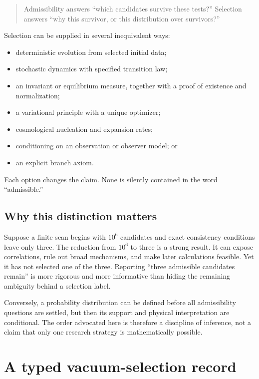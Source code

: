 \documentclass[11pt]{article}
\theoremstyle{definition}
\theoremstyle{remark}
\newcommand{\1}{\mathbf 1}
\begin{document}
\begin{quote}
Admissibility answers ``which candidates survive these tests?''  Selection
answers ``why this survivor, or this distribution over survivors?''
\end{quote}

Selection can be supplied in several inequivalent ways:
\begin{itemize}[leftmargin=2em]
\item deterministic evolution from selected initial data;
\item stochastic dynamics with specified transition law;
\item an invariant or equilibrium measure, together with a proof of
      existence and normalization;
\item a variational principle with a unique optimizer;
\item cosmological nucleation and expansion rates;
\item conditioning on an observation or observer model; or
\item an explicit branch axiom.
\end{itemize}
Each option changes the claim.  None is silently contained in the word
``admissible.''

\subsection{Why this distinction matters}

Suppose a finite scan begins with \(10^6\) candidates and exact consistency
conditions leave only three.  The reduction from \(10^6\) to three is a
strong result.  It can expose correlations, rule out broad mechanisms, and
make later calculations feasible.  Yet it has not selected one of the
three.  Reporting ``three admissible candidates remain'' is more rigorous
and more informative than hiding the remaining ambiguity behind a
selection label.

Conversely, a probability distribution can be defined before all
admissibility questions are settled, but then its support and physical
interpretation are conditional.  The order advocated here is therefore a
discipline of inference, not a claim that only one research strategy is
mathematically possible.

\section{A typed vacuum-selection record}
\label{sec:record}
\end{document}
